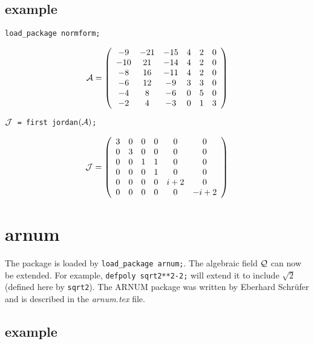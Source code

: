 \subsection{example}

{\tt load\_package normform;}

\begin{displaymath}
{\cal A} = \left( \begin{array}{cccccc} -9 & -21 & -15 & 4 & 2 & 0 \\
-10 & 21 & -14 & 4 & 2 & 0 \\ -8 & 16 & -11 & 4 & 2 & 0 \\ -6 & 12 & -9 
& 3 & 3 & 0 \\ -4 & 8 & -6 & 0 & 5 & 0 \\ -2 & 4 & -3 & 0 & 1 & 3 
\end{array} \right)
\end{displaymath}

\begin{flushleft}
{\tt ${\cal J}$ = first jordan$({\cal A})$;}
\end{flushleft}
  
\begin{displaymath}
{\cal J} = \left( \begin{array}{cccccc} 3 & 0 & 0 & 0 & 0 & 0 \\ 0 & 3 
& 0 & 0 & 0 & 0 \\ 0 & 0 & 1 & 1 & 0 & 0 \\ 0 & 0 & 0 & 1 & 0 & 0 \\
 0 & 0 & 0 & 0 & i+2 & 0 \\ 0 & 0 & 0 & 0 & 0 & -i+2 
\end{array} \right)
\end{displaymath}

\newpage


\section{arnum}

The package is loaded by {\tt load\_package arnum;}. The algebraic 
field ${\cal Q}$ can now be extended. For example, {\tt defpoly 
sqrt2**2-2;} will extend it to include ${\sqrt{2}}$ (defined here by 
{\tt sqrt2}). The {\small ARNUM} package was written by Eberhard 
Schr\"ufer and is described in the {\it arnum.tex} file.

\subsection{example}


